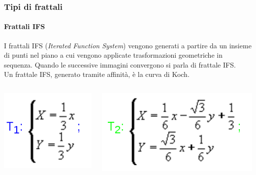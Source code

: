 \documentclass{beamer}
\begin{document}
		\begin{frame}
			\frametitle{Tipi di frattali}
			\framesubtitle{Frattali IFS}
			I frattali IFS (\textit{Iterated Function System}) vengono generati a partire da un insieme di punti nel piano a cui vengono applicate trasformazioni geometriche in sequenza. Quando le successive immagini convergono si parla di frattale IFS.\\
			Un frattale IFS, generato tramite affinità, è la curva di Koch.
			\begin{columns}
				\begin{column}{0.25\textwidth}
					\begin{center}
						\includegraphics[width=1\linewidth]{"../Curva di Koch/t1"}
					\end{center}
				\end{column}
				\begin{column}{0.25\textwidth}
					\begin{center}
						\includegraphics[width=1\linewidth]{"../Curva di Koch/t2"}

\end{center}
\end{column}
\end{columns}
\end{frame}
\end{document}
